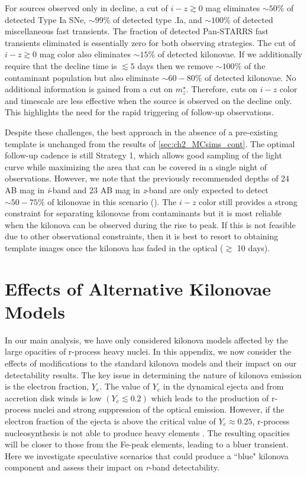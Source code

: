 For sources observed only in decline, a cut of $i-z\gtrsim0$ mag eliminates $\sim50\%$ of detected Type Ia SNe, $\sim99\%$ of detected type .Ia, and $\sim 100\%$ of detected miscellaneous fast transients. The fraction of detected Pan-STARRS fast transients eliminated is essentially zero for both observing strategies. The cut of $i-z\gtrsim0$ mag color also eliminates $\sim 15\%$ of detected kilonovae. If we additionally require that the decline time is $\lesssim 5$ days then we remove $\sim100\%$ of the contaminant population but also eliminate $\sim60-80\%$ of detected kilonovae. No additional information is gained from a cut on $m^{\star}_z$. Therefore, cuts on $i-z$ color and timescale are less effective when the source is observed on the decline only. This highlights the need for the rapid triggering of follow-up observations.

Despite these challenges, the best approach in the absence of a pre-existing template is unchanged from the results of \cref{sec:ch2_MCsims_cont}. The optimal follow-up cadence is still Strategy 1, which allows good sampling of the light curve while maximizing the area that can be covered in a single night of observations. However, we note that the previously recommended depths of 24 AB mag in {\em i}-band and 23 AB mag in {\em z}-band are only expected to detect $\sim50-75\%$ of kilonovae in this scenario (). The $i-z$ color still provides a strong constraint for separating kilonovae from contaminants but it is most reliable when the kilonova can be observed during the rise to peak. If this is not feasible due to other observational constraints, then it is best to resort to obtaining template images once the kilonova has faded in the optical ($\gtrsim$ 10 days). 

\section{Effects of Alternative Kilonovae Models}
\label{sec:ch2_altkilo}

In our main analysis, we have only considered kilonova models affected by the large opacities of r-process heavy nuclei. In this appendix, we now consider the effects of modifications to the standard kilonova models and their impact on our detectability results. The key issue in determining the nature of kilonova emission is the electron fraction, $Y_e$. The value of $Y_e$ in the dynamical ejecta and from accretion disk winds is low $(Y_e \lesssim 0.2)$ which leads to the production of r-process nuclei and strong suppression of the optical emission. However, if the electron fraction of the ejecta is above the critical value of $Y_e \approx 0.25$, r-process nucleosynthesis is not able to produce heavy elements \citep[particularly the lanthanides][]{Kasen+15}. The resulting opacities will be closer to those from the Fe-peak elements, leading to a bluer transient. Here we investigate speculative scenarios that could produce a ``blue" kilonova component and assess their impact on {\em r}-band detectability.

